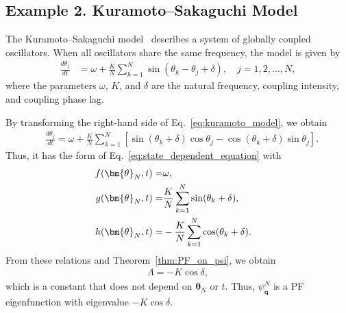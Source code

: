 \documentclass[
amsmath,amssymb,
]{revtex4-2}
\begin{document}
\subsection{Example 2. Kuramoto--Sakaguchi Model}

The Kuramoto--Sakaguchi model~\cite{Kuramoto1984chemical,sakaguchi1986soluble} describes a system of globally coupled oscillators. When all oscillators share the same frequency, the model is given by
%
\begin{align}
    \label{eq:kuramoto_model}
    \frac{d\theta_j}{dt} &= \omega + \frac{K}{N}\sum_{k=1}^{N}\sin(\theta_k - \theta_j + \delta), \quad j = 1, 2, \ldots, N,
\end{align}
where the parameters $\omega$, $K$, and $\delta$ are the natural frequency, coupling intensity, and coupling phase lag.

By transforming the right-hand side of Eq.~\eqref{eq:kuramoto_model}, we obtain
\begin{align}
    &\frac{d\theta_j}{dt}
    = \omega + \frac{K}{N} \sum_{k=1}^N \left[
        \sin(\theta_k + \delta)\cos \theta_j
        - \cos(\theta_k + \delta)\sin \theta_j
    \right].
\end{align}
Thus, it has the form of Eq.~\eqref{eq:state_dependent_equation} with
\begin{align}
    f(\bm{\theta}_N, t) =& \omega, \cr
    g(\bm{\theta}_N, t) =& \frac{K}{N} \sum_{k=1}^N \sin(\theta_k + \delta), \cr
    h(\bm{\theta}_N, t) =& -\frac{K}{N} \sum_{k=1}^N \cos(\theta_k + \delta).
\end{align}
From these relations and Theorem~\ref{thm:PF_on_psi}, we obtain
\begin{align}
    \Lambda = - K \cos \delta,
\end{align}
% 
which is a constant that does not depend on $\bm{\theta}_N$ or $t$. Thus, $\psi_{\bm{q}}^N$ is a PF eigenfunction with eigenvalue $-K \cos \delta$. 
\par
\end{document}
